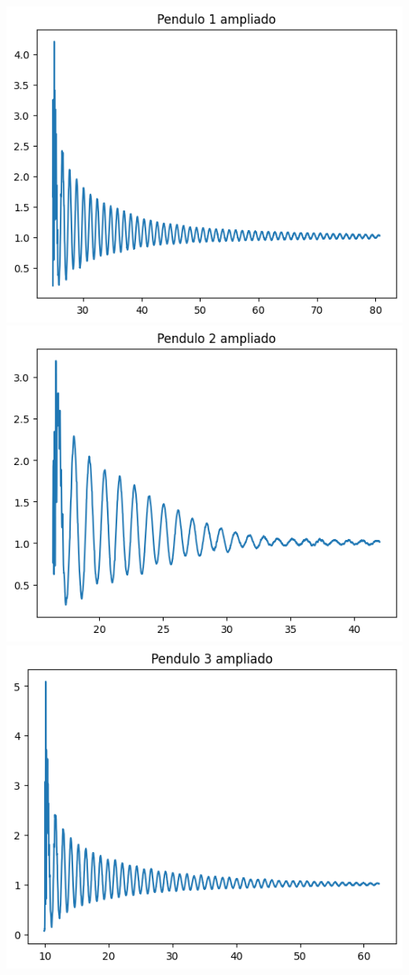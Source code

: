 \documentclass{article}
\begin{document}
\includegraphics{P1.png}\\
\includegraphics{P2.png}\\
\includegraphics{P3.png}\\
\end{document}
